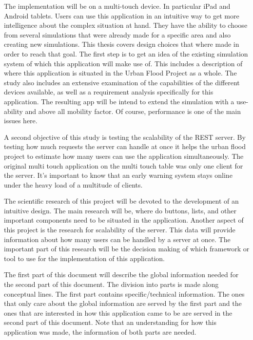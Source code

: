 The implementation will be on a multi-touch device. In particular iPad\cite{ipad} and Android\cite{android} tablets. Users can use this application in an intuitive way to get more intelligence about the complex situation at hand. They have the ability to choose from several simulations that were already made for a specific area and also creating new simulations.
This thesis covers design choices that where made in order to reach that goal. The first step is to get an idea of the existing simulation system of which this application will make use of. This includes a description of where this application is situated in the Urban Flood Project as a whole. The study also includes an extensive examination of the capabilities of the different devices available, as well as a requirement analysis specifically for this application. The resulting app will be intend to extend the simulation with a use-ability and above all mobility factor. Of course, performance is one of the main issues here. 

A second objective of this study is testing the scalability of the REST server\cite{REST}. By testing how much requests the server can handle at once it helps the urban flood project to estimate how many users can use the application simultaneously. The original multi touch application on the multi touch table was only one client for the server. It's important to know that an early warning system stays online under the heavy load of a multitude of clients.

The scientific research of this project will be devoted to the development of an intuitive design. The main research will be, where do buttons, lists, and other important components need to be situated in the application. Another aspect of this project is the research for scalability of the server. This data will provide information about how many users can be handled by a server at once. The important part of this research will be the decision making of which framework or tool to use for the implementation of this application.

The first part of this document will describe the global information needed for the second part of this document. The division into parts is made along conceptual lines. The first part contains specific/technical information. The ones that only care about the global information are served by the first part and the ones that are interested in how this application came to be are served in the second part of this document. Note that an understanding for how this application was made, the information of both parts are needed.

